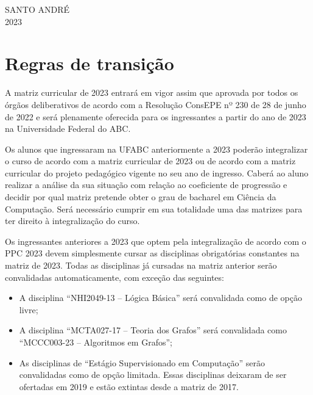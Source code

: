 \documentclass[a4paper]{article}
\begin{document}
\begin{center}
    SANTO ANDRÉ \\ 2023
\end{center}

\newpage

\section{Regras de transição}
\label{sec:regras_transicao}

A matriz curricular de 2023 entrará em vigor assim que aprovada por
todos os órgãos deliberativos de acordo com a Resolução ConsEPE nº 230
de 28 de junho de 2022 e será plenamente oferecida para os
ingressantes a partir do ano de 2023 na Universidade Federal do ABC.

Os alunos que ingressaram na UFABC anteriormente a 2023 poderão integralizar o
curso de acordo com a matriz curricular de 2023 ou de acordo com a matriz
curricular do projeto pedagógico vigente no seu ano de ingresso.
Caberá ao aluno realizar a análise da sua situação com relação ao coeficiente
de progressão e decidir por qual matriz pretende obter o grau de bacharel em
Ciência da Computação.
Será necessário cumprir em sua totalidade uma das matrizes para ter direito à
integralização do curso.

Os ingressantes anteriores a 2023 que optem pela integralização de acordo com
o PPC 2023 devem simplesmente cursar as disciplinas obrigatórias constantes na
matriz de 2023.
Todas as disciplinas já cursadas na matriz anterior serão convalidadas
automaticamente, com exceção das seguintes:
\begin{itemize}
    \item A disciplina ``NHI2049-13 -- Lógica Básica'' será convalidada como de
    opção livre;
    \item A disciplina ``MCTA027-17 -- Teoria dos Grafos'' será convalidada
    como ``MCCC003-23 -- Algoritmos em Grafos'';
    \item As disciplinas de ``Estágio Supervisionado em Computação'' serão
    convalidadas como de opção limitada. Essas disciplinas deixaram de ser
    ofertadas em 2019 e estão extintas desde a matriz de 2017.
\end{itemize}
\end{document}
